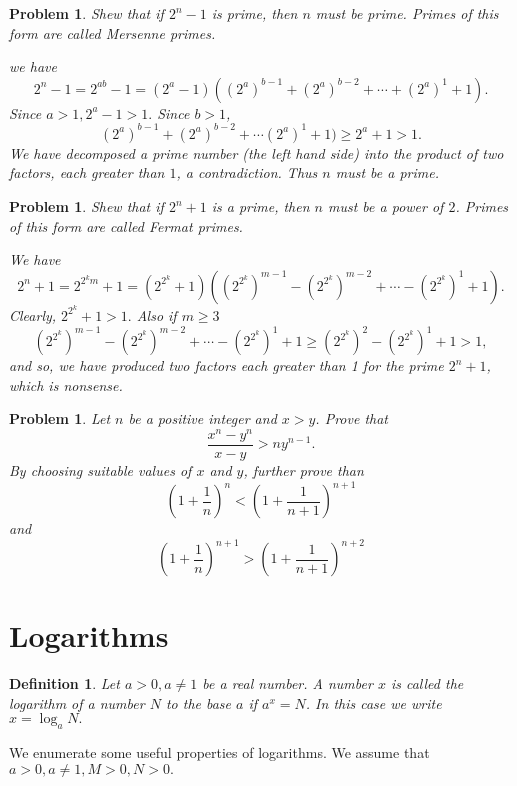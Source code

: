 \documentclass[11pt, openany]{book}
\theoremstyle{change} \theoremheaderfont{\blue\sffamily\bfseries}
\newtheorem{df}[thm]{Definition}
\newtheorem{pro}[thm]{Problem}
\theoremstyle{nonumberplain} \theoremheaderfont{\sffamily\bfseries}
\newcommand{\í}{\'{\i}}
\begin{document}
\begin{multicols}{2}
\begin{pro} Shew that if $2^n - 1$ is prime, then  $n$ must be prime. Primes of this form are
called {\em Mersenne} primes.
\begin{answer}
we have
$$2^n - 1 = 2^{ab} - 1 = (2 ^a - 1)((2^a)^{b - 1} + (2^a)^{b - 2} + \cdots + (2^a)^1 +
1).$$Since $a > 1, 2^a - 1 > 1.$ Since $b > 1$,
$$(2^a)^{b - 1} + (2^a)^{b - 2} + \cdots (2^a)^1 +
1) \geq 2^a + 1 > 1.$$ We have decomposed a prime number (the left
hand side) into the product of two factors, each greater than $1$, a
contradiction. Thus $n$ must be a prime.
\end{answer}
\end{pro}
\begin{pro} Shew that if $2^n + 1$ is a prime, then $n$ must be a power of $2$.
Primes of this form are called {\rm Fermat} primes.
\begin{answer}
We have
$$2^n + 1 = 2^{2^km} + 1 = (2 ^{2^k} + 1)((2^{2^k})^{m - 1} - (2^{2^k})^{m - 2} + \cdots - (2^{2^k})^1
+  1).$$Clearly, $2 ^{2^k} + 1 > 1.$ Also if $m \geq 3$
$$(2^{2^k})^{m - 1} - (2^{2^k})^{m - 2} + \cdots - (2^{2^k})^1
+  1 \geq (2^{2^k})^2 - (2^{2^k})^1 + 1 > 1,$$and so, we have
produced two factors each greater than 1 for the prime $2^n + 1$,
which is nonsense.
\end{answer}


\end{pro}
\begin{pro}
Let $n$  be a positive integer and $x > y$. Prove that
$$\frac{x^n - y^n}{x - y} > ny^{n - 1}.$$By choosing suitable values of $x$ and
$y$, further prove than
$$\left(1 + \frac{1}{n}\right)^n < \left(1 + \frac{1}{n + 1}\right)^{n + 1} $$ and
$$
\left(1 + \frac{1}{n}\right)^{n + 1} > \left(1 + \frac{1}{n +
1}\right)^{n + 2} $$
\end{pro}\end{multicols}
\section{Logarithms}

\begin{df}
Let $a > 0, a \neq 1$ be a real number. A number $x$ is called the
{\em logarithm} of a number $N$ to the base $a$ if $a^x = N$. In
this case we write $x = \log _a N.$
\end{df}

We enumerate some useful properties of  logarithms. We assume
that $a > 0, a \neq 1, M > 0, N > 0.$
\end{document}
